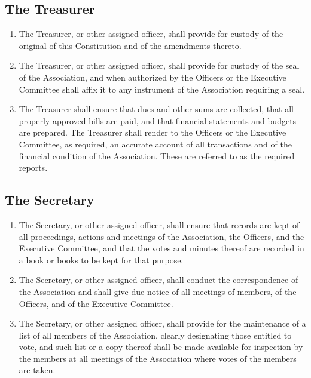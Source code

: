 \documentclass[12pt,letterpaper]{article}
\begin{document}
\subsection{The Treasurer}
\begin{enumerate}
  \item The Treasurer, or other assigned officer, shall provide for custody of the
        original of this Constitution and of the amendments thereto.
  \item The Treasurer, or other assigned officer, shall provide for custody of the
        seal of the Association, and when authorized by the Officers or the Executive
        Committee shall affix it to any instrument of the Association requiring a seal.
  \item The Treasurer shall ensure that dues and other sums are collected, that all
        properly approved bills are paid, and that financial statements and budgets
        are prepared. The Treasurer shall render to the Officers or the Executive
        Committee, as required, an accurate account of all transactions and of the
        financial condition of the Association. These are referred to as the required
        reports.
\end{enumerate}

\subsection{The Secretary}
\begin{enumerate}
  \item The Secretary, or other assigned officer, shall ensure that records are kept
        of all proceedings, actions and meetings of the Association, the Officers,
        and the Executive Committee, and that the votes and minutes thereof are
        recorded in a book or books to be kept for that purpose.
  \item The Secretary, or other assigned officer, shall conduct the correspondence of
        the Association and shall give due notice of all meetings of members, of the
        Officers, and of the Executive Committee.
  \item The Secretary, or other assigned officer, shall provide for the maintenance
        of a list of all members of the Association, clearly designating those
        entitled to vote, and such list or a copy thereof shall be made available for
        inspection by the members at all meetings of the Association where votes of
        the members are taken.
\end{enumerate}
\end{document}
